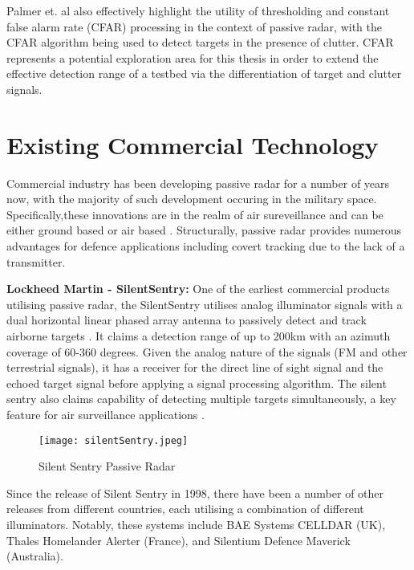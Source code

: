 Palmer et. al also effectively highlight the utility of thresholding and constant false alarm rate (CFAR) processing in the context of passive radar, with the CFAR algorithm being used to detect targets in the presence of clutter. CFAR represents a potential exploration area for this thesis in order to extend the effective detection range of a testbed via the differentiation of target and clutter signals.



\section{Existing Commercial Technology}
Commercial industry has been developing passive radar for a number of years now, with the majority of such development occuring in the military space. Specifically,these innovations are in the realm of air sureveillance and can be either ground based or air based \cite{FundamentalsPassiveRadar}. Structurally, passive radar provides numerous advantages for defence applications including covert tracking due to the lack of a transmitter.
\par \vspace{0.5cm} 
\noindent \textbf{Lockheed Martin - SilentSentry:} One of the earliest commercial products utilising passive radar, the SilentSentry utilises analog illuminator signals with a dual horizontal linear phased array antenna to passively detect and track airborne targets \cite{DTSO2009}. It claims a detection range of up to 200km with an azimuth coverage of 60-360 degrees. Given the analog nature of the signals (FM and other terrestrial signals), it has a receiver for the direct line of sight signal and the echoed target signal before applying a signal processing algorithm. The silent sentry also claims capability of detecting multiple targets simultaneously, a key feature for air surveillance applications \cite{SilentSentry}.

\begin{figure}[htbp]
    \centering
    \texttt{[image: silentSentry.jpeg]}
    \caption{Silent Sentry Passive Radar \cite{SilentSentry}}
    \label{fig:silentSentry}
\end{figure}

Since the release of Silent Sentry in 1998, there have been a number of other releases from different countries, each utilising a combination of different illuminators. Notably, these systems include BAE Systems CELLDAR (UK), Thales Homelander Alerter (France), and Silentium Defence Maverick (Australia). 